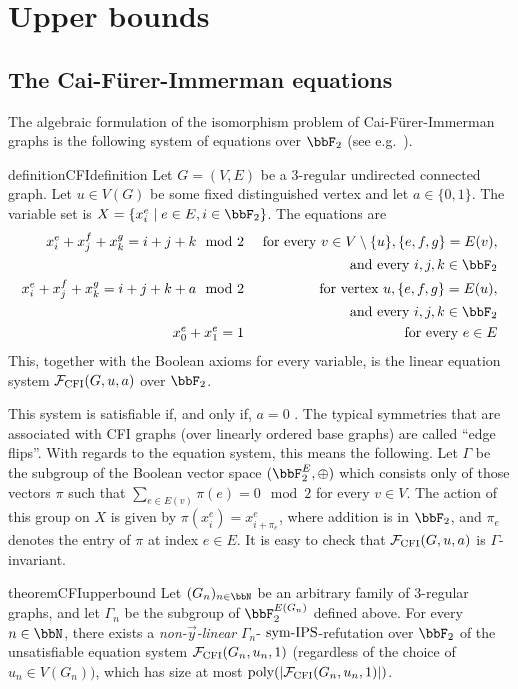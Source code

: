 \documentclass[10pt,a4paper]{article}
\newcommand{\Ff}{{\cal F}}
\newcommand{\CFI}{\Ff_{\mathrm{CFI}}}
\newcommand{\poly}{\text{\upshape poly}}
\newcommand{\symIPS}{\text{ \upshape sym-IPS}}
\begin{document}
\section{Upper bounds}

\subsection{The Cai-Fürer-Immerman equations}
\label{sec:CFI}



The algebraic formulation of the isomorphism problem of Cai-Fürer-Immerman graphs is the following system of equations over $\bbF_2$ (see e.g.\ \cite{atseriasBulatovDawar}).
\begin{restatable}{definition}{CFIdefinition}
	\label{def:CFI}
	Let $G = (V,E)$ be a 3-regular undirected connected graph. Let $u \in V(G)$ be some fixed distinguished vertex and let $a \in \{0,1\}$. 
	The variable set is $X = \{x^e_i \mid e \in E, i \in \bbF_2\}$. The equations are
	\begin{align*}
		x_i^{e} + x_j^{f}  + x_k^{g} = i+j+k \mod 2  & & \text{      for every } v \in V \setminus \{u\}, \{e,f,g\} = E(v),\\
		&  & \text{ and every } i,j,k \in \bbF_2\\
		x_i^{e} + x_j^{f}  + x_k^{g} = i+j+k+a \mod 2 & & \text{ for vertex } u, \{e,f,g\} = E(u),\\
		&  & \text{ and every } i,j,k \in \bbF_2\\
		x_0^{e} + x_1^{e} = 1 & & \text{ for every } e \in E
	\end{align*}	
	This, together with the Boolean axioms for every variable, is the linear equation system $\CFI(G, u, a)$ over $\bbF_2$.
\end{restatable}
This system is satisfiable if, and only if, $a = 0$ \cite{atseriasBulatovDawar}. 
The typical symmetries that are associated with CFI graphs (over linearly ordered base graphs) are called ``edge flips''. With regards to the equation system, this means the following. Let $\Gamma$ be the subgroup of the Boolean vector space $(\bbF_2^{E}, \oplus)$ which consists only of those vectors $\pi$ such that $\sum_{e \in E(v)} \pi(e) = 0 \mod 2$ for every $v \in V$. 
The action of this group on $X$ is given by $\pi(x^e_i) = x^e_{i+\pi_e}$, where addition is in $\bbF_2$, and $\pi_e$ denotes the entry of $\pi$ at index $e \in E$. It is easy to check that $\CFI(G, u, a)$ is $\Gamma$-invariant. 

\begin{restatable}{theorem}{CFIupperbound}
	\label{thm:symmetricF2RefutationCFI}
	Let $(G_n)_{n \in \bbN}$ be an arbitrary family of $3$-regular graphs, and let $\Gamma_n$ be the subgroup of $\bbF_2^{E(G_n)}$ defined above.
	For every $n \in \bbN$, there exists a \emph{non-$\vec{y}$-linear} $\Gamma_n$-$\symIPS$-refutation over $\bbF_2$ of the unsatisfiable equation system $\CFI(G_n, u_n, 1)$ (regardless of the choice of $u_n \in V(G_n))$, which has size at most $\poly(|\CFI(G_n, u_n, 1)|)$. 
\end{restatable}	
\end{document}
